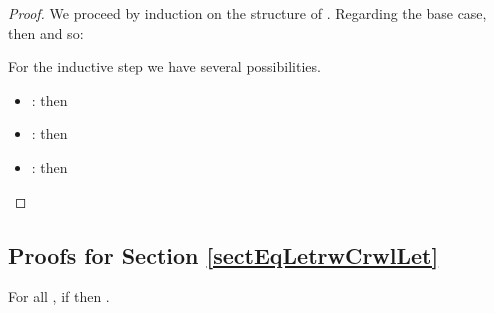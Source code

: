 
\begin{proof}\label{DEMO_HipSemDistCntx}
We proceed by induction on the structure of . Regarding the base case, then  and so:

For the inductive step we have several possibilities.
\begin{itemize}
    \item : then


    \item : then


    \item : then


\end{itemize}


\end{proof}


\subsection{Proofs for Section \ref{sectEqLetrwCrwlLet}}




For all , if  then .

